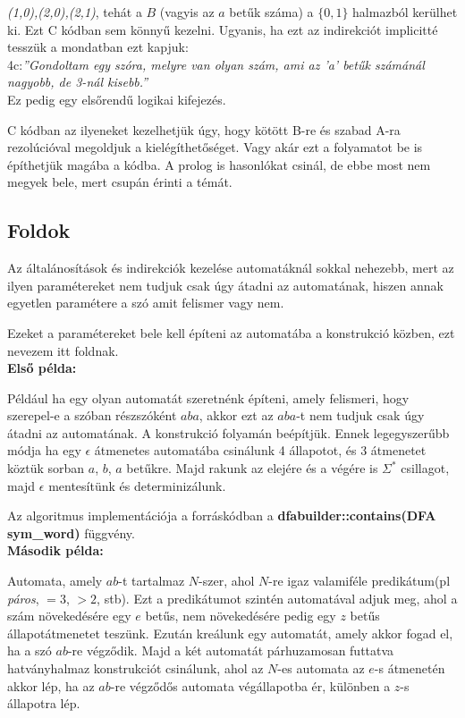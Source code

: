 \documentclass[12pt]{report}
\theoremstyle{definition}
\begin{document}
\textit{(1,0),(2,0),(2,1)}, tehát a $B$ (vagyis az $a$ betűk száma) a $\{0,1\}$ halmazból kerülhet ki.
Ezt C kódban sem könnyű kezelni. Ugyanis, ha ezt az indirekciót implicitté tesszük a mondatban ezt kapjuk:\\
4c:\textit{”Gondoltam egy szóra, melyre van olyan szám, ami az ’a’ betűk számánál nagyobb, de 3-nál kisebb.”}\\
Ez pedig egy elsőrendű logikai kifejezés.

C kódban az ilyeneket kezelhetjük úgy, hogy kötött B-re és szabad A-ra rezolúcióval megoldjuk a kielégíthetőséget. Vagy akár ezt a folyamatot be is építhetjük magába a kódba. A prolog is hasonlókat csinál, de ebbe most nem megyek bele, mert csupán érinti a témát.

\subsection{Foldok}
Az általánosítások és indirekciók kezelése automatáknál sokkal nehezebb, mert az ilyen paramétereket nem tudjuk csak úgy átadni az automatának, hiszen annak egyetlen paramétere a szó amit felismer vagy nem.

Ezeket a paramétereket bele kell építeni az automatába a konstrukció közben, ezt nevezem itt foldnak.\\

\textbf{Első példa:}

Például ha egy olyan automatát szeretnénk építeni, amely felismeri, hogy szerepel-e a szóban részszóként $aba$, akkor ezt az $aba$-t nem tudjuk csak úgy átadni az automatának. A konstrukció folyamán beépítjük. Ennek legegyszerűbb módja ha egy $\epsilon$ átmenetes automatába  csinálunk 4 állapotot, és 3 átmenetet köztük sorban $a$, $b$, $a$ betűkre. Majd rakunk az elejére és a végére is $\Sigma^*$ csillagot, majd $\epsilon$ mentesítünk és determinizálunk.

Az algoritmus implementációja a forráskódban a \textbf{dfabuilder::contains(DFA\\sym\_word)} függvény.\\

\textbf{Második példa:}

Automata, amely $ab$-t tartalmaz $N$-szer, ahol $N$-re igaz valamiféle predikátum(pl \textit{páros}, $=3$, $>2$, stb). Ezt a predikátumot szintén automatával adjuk meg, ahol a szám növekedésére egy $e$ betűs, nem növekedésére pedig egy $z$ betűs állapotátmenetet teszünk. Ezután kreálunk egy automatát, amely akkor fogad el, ha a szó $ab$-re végződik. Majd a két automatát párhuzamosan futtatva hatványhalmaz konstrukciót csinálunk, ahol az $N$-es automata az $e$-s átmenetén akkor lép, ha az $ab$-re végződős automata végállapotba ér, különben a $z$-s állapotra lép.
\end{document}
